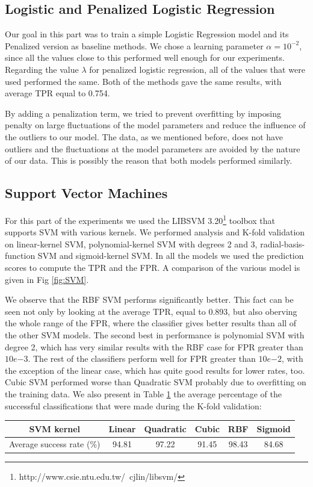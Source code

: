 \subsection{Logistic and Penalized Logistic Regression}
\noindent Our goal in this part was to train a simple Logistic Regression model and its Penalized version as baseline methods. We chose a learning parameter $\alpha = 10^{-2}$, since all the values close to this performed well enough for our experiments. Regarding the value  $\lambda$ for penalized logistic regression, all of the values that were used performed the same.  Both of the methods gave the same results, with average TPR equal to 0.754.

 By adding a penalization term, we tried to prevent overfitting by imposing penalty on large fluctuations of the model parameters and reduce the influence of the outliers to our model. The data, as we mentioned before, does not have outliers and the fluctuations at the model parameters are avoided by the nature of our data. This is possibly the reason that both models performed similarly. 
\subsection{Support Vector Machines}
\noindent For this part of the experiments we used the LIBSVM 3.20\footnote{http://www.csie.ntu.edu.tw/~cjlin/libsvm/} toolbox that supports SVM with various kernels.  We performed analysis and K-fold validation on linear-kernel SVM, polynomial-kernel SVM with degrees 2 and 3, radial-basis-function SVM and sigmoid-kernel SVM. In all the models we used the prediction scores to compute the TPR and the FPR. A comparison of the various model is given in Fig \ref{fig:SVM}.

We observe that the RBF SVM performs significantly better. This fact can be seen not only by looking at the average TPR, equal to 0.893, but also oberving the whole range of the FPR, where the classifier gives better results than all of the other SVM models. The second best in performance is polynomial SVM with degree 2, which has very similar results with the RBF case for FPR greater than $10e{-3}$. The rest of the classifiers perform well for FPR greater than $10e{-2}$, with the exception of the linear case, which has quite good results for lower rates, too.  Cubic SVM performed worse than Quadratic SVM probably due to overfitting on the training data. We also present in Table \ref{table:SVM_success} the average percentage of the successful classifications that were made during the K-fold validation:
\begin{table}[h]
  \centering
  \begin{tabular}{ | c | c | c | c | c | c |}
  \hline
  SVM kernel & Linear & Quadratic & Cubic & RBF & Sigmoid \\ \hline
  Average success rate (\%) & 94.81 & 97.22 & 91.45 & 98.43 & 84.68 \\ \hline
  \end{tabular}
  \label{table:SVM_success}
\end{table}
